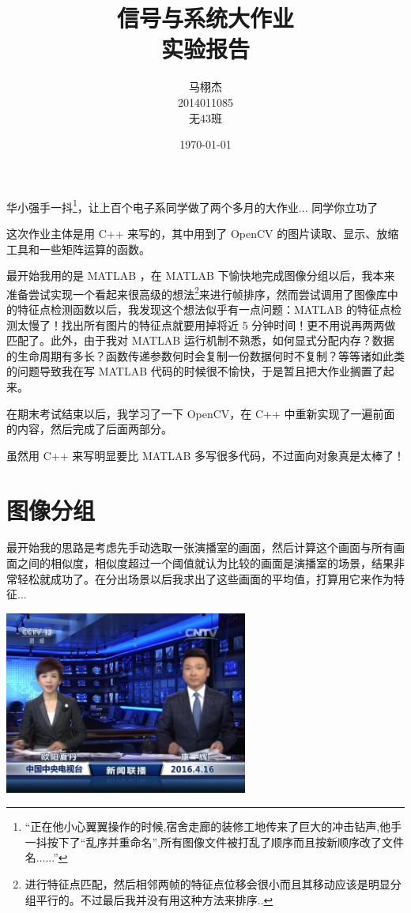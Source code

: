 \documentclass[a4paper, fontset=none]{article}
\title{信号与系统大作业\\实验报告}
\author{马栩杰\\2014011085\\无43班}
\date{\today}
\begin{document}
\maketitle

华小强手一抖\footnote{``正在他小心翼翼操作的时候,宿舍走廊的装修工地传来了巨大的冲击钻声,他手一抖按下了“乱序并重命名”,所有图像文件被打乱了顺序而且按新顺序改了文件名......''}，让上百个电子系同学做了两个多月的大作业... 同学你立功了 \smiley

这次作业主体是用 C++ 来写的，其中用到了 OpenCV 的图片读取、显示、放缩工具和一些矩阵运算的函数。

最开始我用的是 MATLAB ，在 MATLAB 下愉快地完成图像分组以后，我本来准备尝试实现一个看起来很高级的想法\footnote{进行特征点匹配，然后相邻两帧的特征点位移会很小而且其移动应该是明显分组平行的。不过最后我并没有用这种方法来排序..}来进行帧排序，然而尝试调用了图像库中的特征点检测函数以后，我发现这个想法似乎有一点问题：MATLAB 的特征点检测太慢了！找出所有图片的特征点就要用掉将近 5 分钟时间！更不用说再两两做匹配了。此外，由于我对 MATLAB 运行机制不熟悉，如何显式分配内存？数据的生命周期有多长？函数传递参数何时会复制一份数据何时不复制？等等诸如此类的问题导致我在写 MATLAB 代码的时候很不愉快，于是暂且把大作业搁置了起来。

在期末考试结束以后，我学习了一下 OpenCV，在 C++ 中重新实现了一遍前面的内容，然后完成了后面两部分。

虽然用 C++ 来写明显要比 MATLAB 多写很多代码，不过面向对象真是太棒了！

\section{图像分组}
\label{sec:图像分组}

最开始我的思路是考虑先手动选取一张演播室的画面，然后计算这个画面与所有画面之间的相似度，相似度超过一个阈值就认为比较的画面是演播室的场景，结果非常轻松就成功了。在分出场景以后我求出了这些画面的平均值，打算用它来作为特征...

\begin{center}
  \includegraphics[width=0.6\textwidth]{./indoor_average.jpg}
\end{center}
\end{document}
